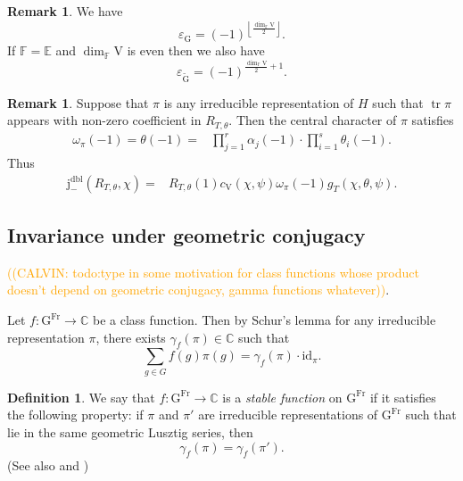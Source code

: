 \documentclass[12pt, reqno]{amsart}
\theoremstyle{definition}
\newtheorem{definition}[theorem]{Definition}
\theoremstyle{definition}
\newtheorem{remark}[theorem]{Remark}
\theoremstyle{definition}
\newcommand{\cComplex}{\mathbb{C}}
\newcommand{\idmap}{\mathrm{id}}
\newcommand{\hermitianSpace}{\mathrm{V}}
\newcommand{\fieldCharacter}{\psi}
\newcommand{\centralCharacter}[1]{\omega_{#1}}
\newcommand{\trace}{\operatorname{tr}}
\newcommand{\GroupExtension}[1]{\widetilde{#1}}
\newcommand{\finiteField}{\mathbb{F}}
\newcommand{\quadraticExtension}{\mathbb{E}}
\newcommand{\Frobenius}{\operatorname{Fr}}
\newcommand{\dblNegVirtualJacobiSumScalar}[2]{\mathrm{j}_{-}^{\mathrm{dbl}}\left(#1, #2\right)}
\newcommand{\algebraicGroup}[1]{\boldsymbol{\mathrm{#1}}}
\newcommand{\calvin}[1]{\textcolor{orange}{\sffamily ((CALVIN: #1))}}
\begin{document}
\begin{remark}
	We have $$\varepsilon_{\algebraicGroup{G}} = \left(-1\right)^{\left\lfloor \frac{\dim_{\finiteField} \hermitianSpace}{2}\right\rfloor}.$$ If $\finiteField = \quadraticExtension$ and $\dim_{\finiteField} \hermitianSpace$ is even then we also have $$\varepsilon_{\algebraicGroup{\GroupExtension{G}}} = \left(-1\right)^{\frac{\dim_{\finiteField} \hermitianSpace}{2} + 1}.$$
\end{remark}
\begin{remark}
	Suppose that $\pi$ is any irreducible representation of $H$ such that $\trace \pi$ appears with non-zero coefficient in $R_{T,\theta}$. Then the central character of $\pi$ satisfies
	\begin{align*}
		\centralCharacter{\pi}\left(-1\right) = \theta\left(-1\right) =& \prod_{j=1}^r \alpha_j\left(-1\right) \cdot \prod_{i=1}^s \theta_i\left(-1\right).
	\end{align*}
	Thus \begin{align*}
		\dblNegVirtualJacobiSumScalar{R_{T, \theta}}{\chi} =& R_{T,\theta}\left(1\right) c_{\hermitianSpace}\left(\chi, \fieldCharacter\right) \centralCharacter{\pi}\left(-1\right) g_T\left(\chi, \theta, \fieldCharacter\right).
	\end{align*}
\end{remark}

\subsection{Invariance under geometric conjugacy}
\calvin{todo:type in some motivation for class functions whose product doesn't depend on geometric conjugacy, gamma functions whatever}.

Let $f \colon \algebraicGroup{G}^{\Frobenius} \to \cComplex$ be a class function. Then by Schur's lemma for any irreducible representation $\pi$, there exists $\gamma_{f}\left(\pi\right) \in \cComplex$ such that $$\sum_{g \in G} f(g)\pi(g) = \gamma_{f}\left(\pi\right) \cdot \idmap_{\pi}.$$

\begin{definition}
	We say that  $f \colon \algebraicGroup{G}^{\Frobenius} \to \cComplex$ is a \emph{stable function} on $\algebraicGroup{G}^{\Frobenius}$ if it satisfies the following property: if $\pi$ and $\pi'$ are irreducible representations of $\algebraicGroup{G}^{\Frobenius}$ such that lie in the same geometric Lusztig series, then $$\gamma_{f}\left(\pi\right) = \gamma_{f}\left(\pi'\right).$$
(See also \cite[Section 4]{LaumonLetellier2023} and \cite[Section 4.1]{ChenBhattacharya2024})
	\end{definition}
\end{document}
